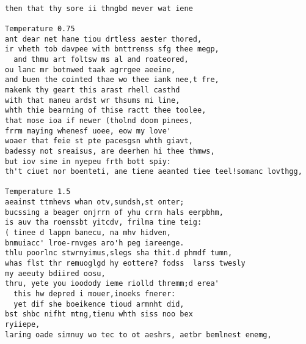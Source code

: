 \documentclass[11pt]{article}
\begin{document}
\begin{Verbatim}[commandchars=\\\{\}]
                    
then that thy sore ii thngbd mever wat iene

Temperature 0.75
ant dear net hane tiou drtless aester thored,
ir vheth tob davpee with bnttrenss sfg thee megp,
  and thmu art foltsw ms al and roateored,
ou lanc mr botnwed taak agrrgee aeeine,
and buen the cointed thae wo thee iank nee,t fre,
makenk thy geart this arast rhell casthd
with that maneu ardst wr thsums mi line,
whth thie bearning of thise ractt thee toolee,
that mose ioa if newer (tholnd doom pinees,
frrm maying whenesf uoee, eow my love'
woaer that feie st pte pacesgsn whth giavt,
badessy not sreaisus, are deerhen hi thee thmws,
but iov sime in nyepeu frth bott spiy:
th't ciuet nor boenteti, ane tiene aeanted tiee teel!somanc lovthgg,

Temperature 1.5
aeainst ttmhevs whan otv,sundsh,st onter;
bucssing a beager onjrrn of yhu crrn hals eerpbhm,
is auv tha roenssbt yitcdv, frilma time teig:
( tinee d lappn banecu, na mhv hidven,
bnmuiacc' lroe-rnvges aro'h peg iareenge.
thlu poorlnc stwrnyimus,slegs sha thit.d phmdf tumn,
whas flst thr remuoglgd hy eottere? fodss  larss twesly
my aeeuty bdiired oosu,
thru, yete you ioodody ieme riolld thremm;d erea'
  this hw depred i mouer,inoeks fnerer:
  yet dif she boeikence tioud armnht did,
bst shbc nifht mtng,tienu whth siss noo bex
ryiiepe,
laring oade simnuy wo tec to ot aeshrs, aetbr bemlnest enemg,


    \end{Verbatim}


    
    
    
    
\end{document}
